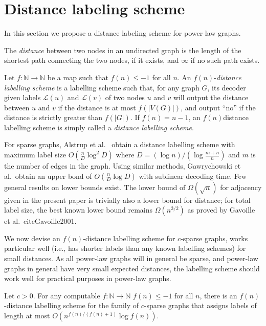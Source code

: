 \section{Distance labeling scheme}\label{Sec:Distance}
In this section we propose a distance labeling scheme for power law graphs. 

The \emph{distance} between two nodes in an undirected graph is the length of the shortest path connecting
the two nodes, if it exists, and $\infty$ if no such path exists.

Let $f : \mathbb{N} \longrightarrow \mathbb{N}$ be a map such that
$f(n) \leq  -1$ for all $n$. An $f(n)$-\emph{distance labelling scheme} is a labelling
scheme such that, for any graph $G$, its decoder given labels $\mathcal{L}(u)$ and $\mathcal{L}(v)$ of two nodes $u$ and $v$
will output the distance between $u$ and $v$ if the distance is at most $f(\vert V(G) \vert)$, and output ``no'' if the distance
is  strictly greater than $f(\vert G \vert)$. If $f(n) = n-1$,
an $f(n)$distance labelling scheme is simply called a \emph{distance labelling scheme}.

For sparse graphs,
Alstrup et al.\ \cite{DBLP:journals/corr/AlstrupDKP15} obtain a distance labelling scheme with maximum label size
$O(\frac{n}{D} \log^2 D)$ where $D = (\log n)/(\log \frac{m+n}{n})$ and $m$ is the number of edges
in the graph.  Using similar methods, Gawrychowski et al.\ obtain an upper bond of \cite{DBLP:journals/corr/GawrychowskiKU15}
$O(\frac{n}{D} \log D)$ with sublinear decoding time. Few general results on lower bounds exist. The lower bound of $\Omega(\sqrt{n})$ for adjacency given in the present paper is trivially also a lower bound for distance; for total label size, the best known lower bound remains $\Omega(n^{3/2})$ as proved by Gavoille et al.\ cite{Gavoille2001}.

We now devise an $f(n)$-distance labelling scheme for $c$-sparse graphs,
works particular well (i.e., has shorter labels than any known labelling schemes) for small distances. As
all power-law graphs will in general be sparse, and power-law graphs in general
have very small expected distances, the labelling scheme should work well for practical purposes in power-law graphs.

\begin{lemma}\label{lem:sparse_small_dist}
Let $c > 0$. For any computable $f : \mathbb{N} \longrightarrow \mathbb{N}$ 
$f(n) \leq  -1$ for all $n$, there is an $f(n)$-distance labelling scheme for the family of $c$-sparse graphs
that assigns labels of length at most $O(n^{f(n)/(f(n) + 1)} \log f(n))$.
\end{lemma}

